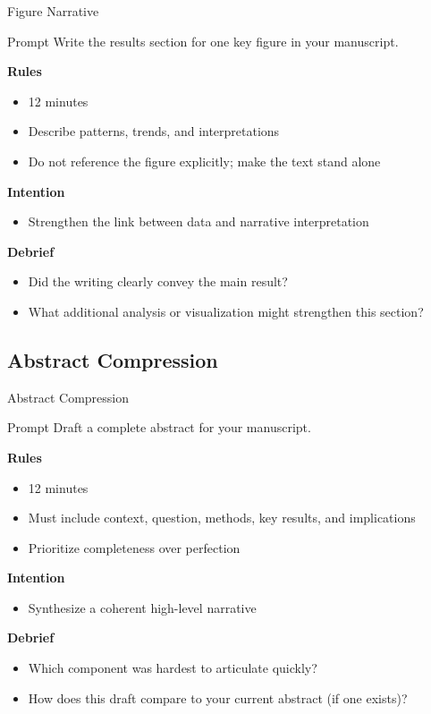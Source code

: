 \documentclass{beamer}
\begin{document}
\begin{frame}{Figure Narrative}
\begin{block}{Prompt}
Write the results section for one key figure in your manuscript.
\end{block}

\vspace{0.8em}
\textbf{Rules}
\begin{itemize}
    \item 12 minutes
    \item Describe patterns, trends, and interpretations
    \item Do not reference the figure explicitly; make the text stand alone
\end{itemize}

\textbf{Intention}
\begin{itemize}
    \item Strengthen the link between data and narrative interpretation
\end{itemize}

\textbf{Debrief}
\begin{itemize}
    \item Did the writing clearly convey the main result?
    \item What additional analysis or visualization might strengthen this section?
\end{itemize}
\end{frame}

\subsection{Abstract Compression}

\begin{frame}{Abstract Compression}
\begin{block}{Prompt}
Draft a complete abstract for your manuscript.
\end{block}

\vspace{0.8em}
\textbf{Rules}
\begin{itemize}
    \item 12 minutes
    \item Must include context, question, methods, key results, and implications
    \item Prioritize completeness over perfection
\end{itemize}

\textbf{Intention}
\begin{itemize}
    \item Synthesize a coherent high-level narrative
\end{itemize}

\textbf{Debrief}
\begin{itemize}
    \item Which component was hardest to articulate quickly?
    \item How does this draft compare to your current abstract (if one exists)?
\end{itemize}
\end{frame}
\end{document}
